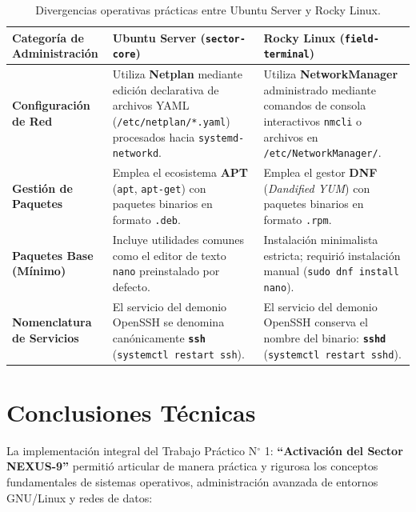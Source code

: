 \documentclass[11pt,a4paper]{article}
\begin{document}
\begin{table}[H]
    \centering
    \footnotesize
    \caption{Divergencias operativas prácticas entre Ubuntu Server y Rocky Linux.}
    \label{tab:comparativa_distros}
    \begin{tabularx}{\textwidth}{lXX}
        \toprule
        \rowcolor{tableheader}
        \textbf{Categoría de Administración} & \textbf{Ubuntu Server (\texttt{sector-core})} & \textbf{Rocky Linux (\texttt{field-terminal})} \\
        \midrule
        \textbf{Configuración de Red} & Utiliza \textbf{Netplan} mediante edición declarativa de archivos YAML (\texttt{/etc/netplan/*.yaml}) procesados hacia \texttt{systemd-networkd}. & Utiliza \textbf{NetworkManager} administrado mediante comandos de consola interactivos \texttt{nmcli} o archivos en \texttt{/etc/NetworkManager/}. \\
        \rowcolor{rowalt}
        \textbf{Gestión de Paquetes} & Emplea el ecosistema \textbf{APT} (\texttt{apt}, \texttt{apt-get}) con paquetes binarios en formato \texttt{.deb}. & Emplea el gestor \textbf{DNF} (\textit{Dandified YUM}) con paquetes binarios en formato \texttt{.rpm}. \\
        \textbf{Paquetes Base (Mínimo)} & Incluye utilidades comunes como el editor de texto \texttt{nano} preinstalado por defecto. & Instalación minimalista estricta; requirió instalación manual (\texttt{sudo dnf install nano}). \\
        \rowcolor{rowalt}
        \textbf{Nomenclatura de Servicios} & El servicio del demonio OpenSSH se denomina canónicamente \textbf{\texttt{ssh}} (\texttt{systemctl restart ssh}). & El servicio del demonio OpenSSH conserva el nombre del binario: \textbf{\texttt{sshd}} (\texttt{systemctl restart sshd}). \\
        \bottomrule
    \end{tabularx}
\end{table}

\section{Conclusiones Técnicas}

La implementación integral del Trabajo Práctico N$^\circ$ 1: \textbf{“Activación del Sector NEXUS-9”} permitió articular de manera práctica y rigurosa los conceptos fundamentales de sistemas operativos, administración avanzada de entornos GNU/Linux y redes de datos:
\end{document}
